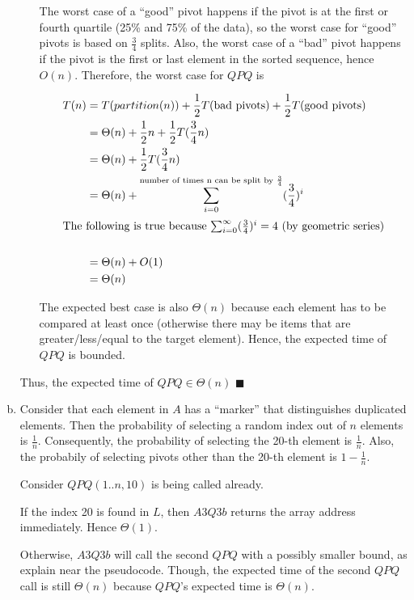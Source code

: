 \documentclass[12pt]{article}
\begin{document}
\begin{enumerate}[(a)]
\begin{itemize}
The worst case of a ``good'' pivot happens if the pivot is at the first or fourth quartile (25\% and 75\% of the data), so the worst case for ``good'' pivots is based on $\frac{3}{4}$ splits.
Also, the worst case of a ``bad'' pivot happens if the pivot is the first or last element in the sorted sequence, hence $O(n)$.
Therefore, the worst case for $QPQ$ is

\begin{align*}
T(n) &= T(partition(n)) + \frac{1}{2}T(\text{bad pivots}) + \frac{1}{2}T(\text{good pivots})\\
	&= \Theta(n) + \frac{1}{2}n + \frac{1}{2}T(\frac{3}{4}n)\\
	&= \Theta(n) + \frac{1}{2}T(\frac{3}{4}n)\\
	&= \Theta(n) + \sum_{i = 0}^{\text{number of times n can be split by $\frac{3}{4}$}} (\frac{3}{4})^i\\
	\intertext{The following is true because $\sum_{i = 0}^{\infty} (\frac{3}{4})^i = 4$ (by geometric series)}\\
	&= \Theta(n) + O(1)\\
	&= \Theta(n)
\end{align*}

The expected best case is also $\Theta(n)$ because each element has to be compared at least once (otherwise there may be items that are greater/less/equal to the target element).
Hence, the expected time of $QPQ$ is bounded.
\end{itemize}
Thus, the expected time of $QPQ \in \Theta(n)$
\hfill $\blacksquare$

\item
Consider that each element in $A$ has a ``marker'' that distinguishes duplicated elements.
Then the probability of selecting a random index out of $n$ elements is $\frac{1}{n}$.
Consequently, the probability of selecting the 20-th element is $\frac{1}{n}$.
Also, the probabily of selecting pivots other than the 20-th element is $1-\frac{1}{n}$.

Consider $QPQ(1..n,10)$ is being called already.

If the index 20 is found in $L$, then $A3Q3b$ returns the array address immediately.
Hence $\Theta(1)$.

Otherwise, $A3Q3b$ will call the second $QPQ$ with a possibly smaller bound, as explain near the pseudocode.
Though, the expected time of the second $QPQ$ call is still $\Theta(n)$ because $QPQ$'s expected time is $\Theta(n)$.


\end{enumerate}
\end{document}
